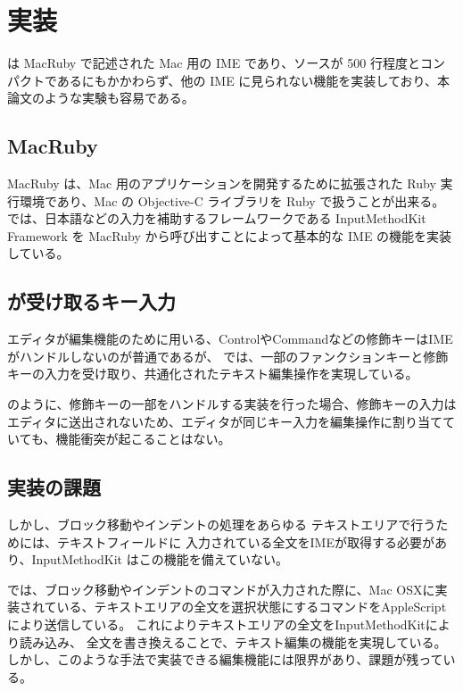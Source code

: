 \section{実装}
{\system} は MacRuby で記述された Mac 用の IME であり、ソースが 500 行程度とコンパクトであるにもかかわらず、他の IME に見られない機能を実装しており、本論文のような実験も容易である。

\subsection{MacRuby}
MacRuby は、Mac 用のアプリケーションを開発するために拡張された Ruby 実行環境であり、Mac の Objective-C ライブラリを Ruby で扱うことが出来る。
{\system} では、日本語などの入力を補助するフレームワークである InputMethodKit Framework を MacRuby から呼び出すことによって基本的な IME の機能を実装している。

\subsection{{\system}が受け取るキー入力}
エディタが編集機能のために用いる、ControlやCommandなどの修飾キーはIMEがハンドルしないのが普通であるが、
{\system}では、一部のファンクションキーと修飾キーの入力を受け取り、共通化されたテキスト編集操作を実現している。

{\system} のように、修飾キーの一部をハンドルする実装を行った場合、修飾キーの入力はエディタに送出されないため、エディタが同じキー入力を編集操作に割り当てていても、機能衝突が起こることはない。

\subsection{実装の課題}
しかし、ブロック移動やインデントの処理をあらゆる テキストエリアで行うためには、テキストフィールドに 入力されている全文をIMEが取得する必要があり、InputMethodKit はこの機能を備えていない。

{\system} では、ブロック移動やインデントのコマンドが入力された際に、Mac OSXに実装されている、テキストエリアの全文を選択状態にするコマンドをAppleScriptにより送信している。
これによりテキストエリアの全文をInputMethodKitにより読み込み、
全文を書き換えることで、テキスト編集の機能を実現している。
しかし、このような手法で実装できる編集機能には限界があり、課題が残っている。
